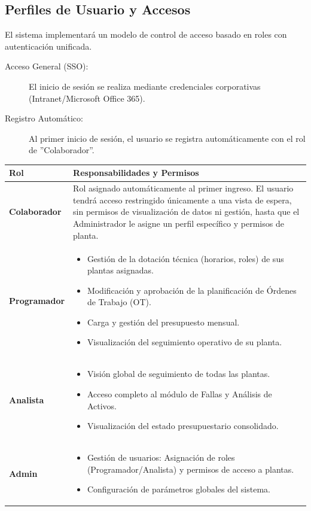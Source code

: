 \documentclass[11pt, letterpaper]{article}
\begin{document}
\subsection{Perfiles de Usuario y Accesos}
El sistema implementará un modelo de control de acceso basado en roles con autenticación unificada.

\begin{description}
    \item[Acceso General (SSO):] El inicio de sesión se realiza mediante credenciales corporativas (Intranet/Microsoft Office 365).
    \item[Registro Automático:] Al primer inicio de sesión, el usuario se registra automáticamente con el rol de ''Colaborador''.
\end{description}

\begin{longtable}{|p{3cm}|p{12cm}|}
\hline
\rowcolor{headergray} \textbf{Rol} & \textbf{Responsabilidades y Permisos} \\ \hline
\textbf{Colaborador} & Rol asignado automáticamente al primer ingreso. El usuario tendrá acceso restringido únicamente a una vista de espera, sin permisos de visualización de datos ni gestión, hasta que el Administrador le asigne un perfil específico y permisos de planta. \\ \hline
\textbf{Programador} & 
\begin{itemize}
    \item Gestión de la dotación técnica (horarios, roles) de sus plantas asignadas.
    \item Modificación y aprobación de la planificación de Órdenes de Trabajo (OT).
    \item Carga y gestión del presupuesto mensual.
    \item Visualización del seguimiento operativo de su planta.
\end{itemize} \\ \hline
\textbf{Analista} & 
\begin{itemize}
    \item Visión global de seguimiento de todas las plantas.
    \item Acceso completo al módulo de Fallas y Análisis de Activos.
    \item Visualización del estado presupuestario consolidado.
\end{itemize} \\ \hline
\textbf{Admin} & 
\begin{itemize}
    \item Gestión de usuarios: Asignación de roles (Programador/Analista) y permisos de acceso a plantas.
    \item Configuración de parámetros globales del sistema.
\end{itemize} \\ \hline
\end{longtable}
\end{document}
